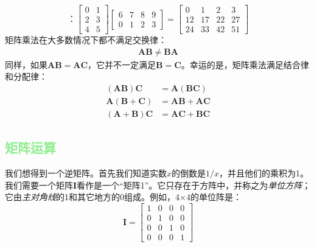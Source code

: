 \documentclass[lang=cn,12pt]{elegantbook}
\begin{document}
$$：\left[\begin{array}{ll}
0 & 1 \\
2 & 3 \\
4 & 5
\end{array}\right]\left[\begin{array}{llll}
6 & 7 & 8 & 9 \\
0 & 1 & 2 & 3
\end{array}\right]=\left[\begin{array}{rrrr}
0 & 1 & 2 & 3 \\
12 & 17 & 22 & 27 \\
24 & 33 & 42 & 51
\end{array}\right]
$$
矩阵乘法在大多数情况下都不满足交换律：
\begin{align}
\mathbf{AB} \neq \mathbf{BA}
\end{align}
同样，如果$\mathbf{AB} = \mathbf{AC}$，它并不一定满足$\mathbf{B} = \mathbf{C}$。幸运的是，矩阵乘法满足结合律和分配律：
$$
\begin{aligned}
(\mathbf{A B}) \mathbf{C} & =\mathbf{A}(\mathbf{B C}) \\
\mathbf{A}(\mathbf{B}+\mathbf{C}) & =\mathbf{A B}+\mathbf{A C} \\
(\mathbf{A}+\mathbf{B}) \mathbf{C} & =\mathbf{A C}+\mathbf{B C}
\end{aligned}
$$

\subsection{\textcolor{lightgreen}{矩阵运算}}

我们想得到一个逆矩阵。首先我们知道实数$x$的倒数是$1/x$，并且他们的乘积为1。我们需要一个矩阵$\mathbf{I}$看作是一个“矩阵1”。它只存在于方阵中，并称之为\textit{单位方阵}；它由\textit{主对角线}的1和其它地方的0组成。例如，4×4的单位阵是：
$$
\mathbf{I}=\left[\begin{array}{llll}
1 & 0 & 0 & 0 \\
0 & 1 & 0 & 0 \\
0 & 0 & 1 & 0 \\
0 & 0 & 0 & 1
\end{array}\right]
$$
\end{document}
